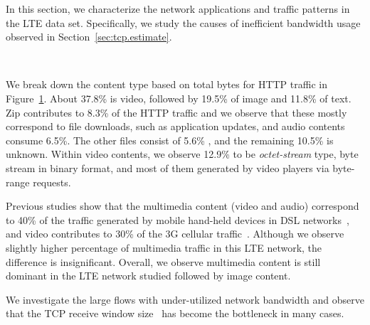 \label{sec:tcp.app}

In this section, we characterize the network applications and traffic patterns in the LTE data set. Specifically, we study the causes of inefficient bandwidth usage observed in Section~\ref{sec:tcp.estimate}.


\label{sec:http_content}

\begin{figure}[t]
\centering
{}\\
\label{fig:content.type}
\end{figure}

We break down the content type based on total bytes for HTTP traffic in Figure~\ref{fig:content.type}.
About 37.8\% is video, followed by 19.5\% of image and 11.8\% of text. Zip contributes to 8.3\% of the HTTP traffic and we observe that these mostly correspond to file downloads, such as application updates, and audio contents consume 6.5\%. The other files consist of 5.6\% , and the remaining 10.5\% is unknown. Within video contents, we observe 12.9\% to be \emph{octet-stream} type, \ie byte stream in binary format, and most of them generated by video players via byte-range requests.

Previous studies show that the multimedia content (video and audio) correspond to 40\% of the traffic generated by mobile hand-held devices in DSL networks~\cite{maier10}, and video contributes to 30\% of the 3G cellular traffic~\cite{erman11}. Although we observe slightly higher percentage of multimedia traffic in this LTE network, the difference is insignificant. Overall, we observe multimedia content is still dominant in the LTE network studied followed by image content.



We investigate the large flows with under-utilized network bandwidth and observe that the TCP receive window size~\cite{rfc1323} has become the bottleneck in many cases.

\begin{figure}[t]
\centering
{}\\
\label{fig:shazam}
\end{figure}

